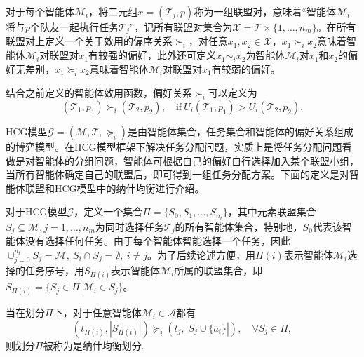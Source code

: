 \begin{definition}[偏好关系]
	对于每个智能体$\mathcal{M}_i$，将二元组$x=(\mathcal{T}_j,p)$称为一组联盟对，意味着“智能体$\mathcal{M}_i$将与$p$个队友一起执行任务$\mathcal{T}_j$”，记所有联盟对集合为$\mathcal{X}=\mathcal{T}\times\{1,\dots,n_m\}$。在所有联盟对上定义一个关于效用的偏序关系$\succ_i$，对任意$x_1,x_2 \in \mathcal{X}$，$x_1 \succ_i x_2$意味着智能体$\mathcal{M}_i$对联盟对$x_1$有较强的偏好，此外还可定义$x_1 \sim_i x_2$为智能体$\mathcal{M}_i$对$x_1$和$x_2$的偏好无差别，$x_1 \succeq_i x_2$意味着智能体$\mathcal{M}_i$对联盟对$x_1$有较弱的偏好。
\end{definition}

结合之前定义的智能体效用函数，偏好关系$\succ_i$可以定义为
\begin{equation}
\label{hcg:eq:preference}
	(\mathcal{T}_1,p_1) \succ_i (\mathcal{T}_2,p_2),\quad \text{if}\ U_i(\mathcal{T}_1,p_1) > U_i(\mathcal{T}_2,p_2).
\end{equation}

HCG模型$\mathcal{G}=(\mathcal{M},\mathcal{T},\succeq_i)$是由智能体集合，任务集合和智能体的偏好关系组成的博弈模型。在HCG模型框架下解决任务分配问题，实质上是将任务分配问题看做是对智能体的分组问题，智能体可根据自己的偏好自行选择加入某个联盟小组，当所有智能体确定自己的联盟后，即可得到一组任务分配方案。下面的定义是对智能体联盟和HCG模型中的纳什均衡进行介绍。


\begin{definition}[联盟划分]
	对于HCG模型$\mathcal{G}$，定义一个集合$\Pi = \{S_0,S_1,\dots,S_{n_t}\}$，其中元素联盟集合$S_j \subseteq \mathcal{M},j=1,\dots,n_m$为同时选择任务$\mathcal{T}_j$的所有智能体集合，特别地，$S_0$代表该智能体没有选择任何任务。由于每个智能体智能选择一个任务，因此$\cup_{j=0}^{n_t} S_j = \mathcal{M},\ S_i \cap S_j =\emptyset,\ i \neq j$。为了后续论述方便，用$\Pi(i)$表示智能体$\mathcal{M}_i$选择的任务序号，用$S_{\Pi(i)}$表示智能体$\mathcal{M}_i$所属的联盟集合，即$S_{\Pi(i)}=\{S_j \in \Pi|\mathcal{M}_i \in S_j\}$。
\end{definition}


\begin{definition}[HCG模型的纳什均衡]
	当在划分$\Pi$下，对于任意智能体$\mathcal{M}_i \in \mathcal{A}$都有
	\begin{equation}
	\label{hcg:eq:nash_stable}
		(t_{\Pi(i)},|S_{\Pi(i)}|) \succeq_i (t_j,|S_j \cup \{a_i\}|),\quad \forall S_j \in \Pi,
	\end{equation}
	则划分$\Pi$被称为是纳什均衡划分.
\end{definition}

